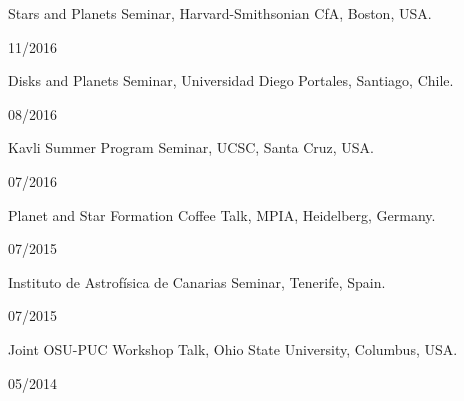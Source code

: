 \documentclass[12pt, a4paper]{article} %
\begin{document}
\begin{minipage}[t]{0.7\textwidth}
\begin{flushleft}%
  \setlength{\leftskip}{0.2cm}%
Stars and Planets Seminar, Harvard-Smithsonian CfA, Boston, USA.
\end{flushleft}
\end{minipage}
\begin{minipage}[t]{0.3\textwidth}
\hfill 11/2016
\end{minipage}


\begin{minipage}[t]{0.7\textwidth}
\begin{flushleft}%
  \setlength{\leftskip}{0.2cm}%
Disks and Planets Seminar, Universidad Diego Portales, Santiago, Chile.
\end{flushleft}
\end{minipage}
\begin{minipage}[t]{0.3\textwidth}
\hfill 08/2016
\end{minipage}

\begin{minipage}[t]{0.7\textwidth}
\begin{flushleft}%
  \setlength{\leftskip}{0.2cm}%
Kavli Summer Program Seminar, UCSC, Santa Cruz, USA.
\end{flushleft}
\end{minipage}
\begin{minipage}[t]{0.3\textwidth}
\hfill 07/2016
\end{minipage}

\begin{minipage}[t]{0.7\textwidth}
\begin{flushleft}%
  \setlength{\leftskip}{0.2cm}%
Planet and Star Formation Coffee Talk, MPIA,  Heidelberg, Germany.
\end{flushleft}
\end{minipage}
\begin{minipage}[t]{0.3\textwidth}
\hfill 07/2015
\end{minipage}

\begin{minipage}[t]{0.7\textwidth}
\begin{flushleft}%
  \setlength{\leftskip}{0.2cm}%
Instituto de Astrof\'isica de Canarias Seminar, Tenerife, Spain.
\end{flushleft}
\end{minipage}
\begin{minipage}[t]{0.3\textwidth}
\hfill 07/2015
\end{minipage}
\begin{minipage}[t]{0.7\textwidth}
\begin{flushleft}%
  \setlength{\leftskip}{0.2cm}%
Joint OSU-PUC Workshop Talk, Ohio State University, Columbus, USA.
\end{flushleft}
\end{minipage}
\begin{minipage}[t]{0.3\textwidth}
\hfill 05/2014
\end{minipage}
\end{document}
